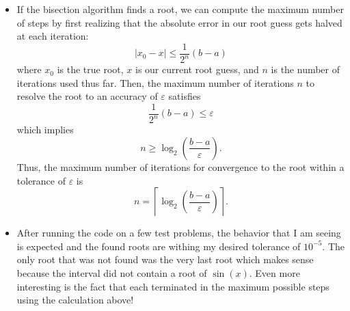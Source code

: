 \documentclass[a4paper,12pt]{article}
\newcommand{\abs}[1]{\left| #1 \right|}
\begin{document}
\begin{itemize}
    \item If the bisection algorithm finds a root, we can compute the maximum number of steps by first realizing that the absolute error in our root guess gets halved at each iteration:
    \[
        \abs{x_0 - x} \leq \frac{1}{2^n}(b - a)
    \]
    where $x_0$ is the true root, $x$ is our current root guess, and $n$ is the number of iterations used thus far. Then, the maximum number of iterations $n$ to resolve the root to an accuracy of $\varepsilon$ satisfies
    \[
        \frac{1}{2^n}(b - a) \leq \varepsilon
    \]
    which implies
    \[
        n \geq \log_2\left(\frac{b - a}{\varepsilon}\right).
    \]
    Thus, the maximum number of iterations for convergence to the root within a tolerance of $\varepsilon$ is
    \[
        n = \left\lceil \log_2\left(\frac{b - a}{\varepsilon}\right) \right\rceil.
    \]
    
    \item After running the code on a few test problems, the behavior that I am seeing is expected and the found roots are withing my desired tolerance of $10^{-5}$. The only root that was not found was the very last root which makes sense because the interval did not contain a root of $\sin(x)$. Even more interesting is the fact that each terminated in the maximum possible steps using the calculation above!
\end{itemize}
\end{document}
